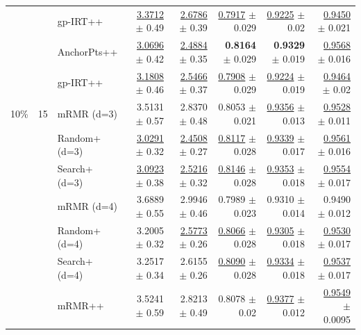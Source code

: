 \begin{longtable}{llp{}rrrrr}
 &  & gp-IRT++ & \underline{3.3712} {\scriptsize $\pm$ 0.49} & \underline{2.6786} {\scriptsize $\pm$ 0.39} & \underline{0.7917} {\scriptsize $\pm$ 0.029} & \underline{0.9225} {\scriptsize $\pm$ 0.02} & \underline{0.9450} {\scriptsize $\pm$ 0.021} \\
 &  & AnchorPts++ & \underline{3.0696} {\scriptsize $\pm$ 0.42} & \underline{2.4884} {\scriptsize $\pm$ 0.35} & \textbf{0.8164} {\scriptsize $\pm$ 0.029} & \textbf{0.9329} {\scriptsize $\pm$ 0.019} & \underline{0.9568} {\scriptsize $\pm$ 0.016} \\
 &  & gp-IRT++ & \underline{3.1808} {\scriptsize $\pm$ 0.46} & \underline{2.5466} {\scriptsize $\pm$ 0.37} & \underline{0.7908} {\scriptsize $\pm$ 0.029} & \underline{0.9224} {\scriptsize $\pm$ 0.019} & \underline{0.9464} {\scriptsize $\pm$ 0.02} \\
\midrule
10\% & 15 & mRMR (d=3) & 3.5131 {\scriptsize $\pm$ 0.57} & 2.8370 {\scriptsize $\pm$ 0.48} & 0.8053 {\scriptsize $\pm$ 0.021} & \underline{0.9356} {\scriptsize $\pm$ 0.013} & \underline{0.9528} {\scriptsize $\pm$ 0.011} \\
 &  & Random+ (d=3) & \underline{3.0291} {\scriptsize $\pm$ 0.32} & \underline{2.4508} {\scriptsize $\pm$ 0.27} & \underline{0.8117} {\scriptsize $\pm$ 0.028} & \underline{0.9339} {\scriptsize $\pm$ 0.017} & \underline{0.9561} {\scriptsize $\pm$ 0.016} \\
 &  & Search+ (d=3) & \underline{3.0923} {\scriptsize $\pm$ 0.38} & \underline{2.5216} {\scriptsize $\pm$ 0.32} & \underline{0.8146} {\scriptsize $\pm$ 0.028} & \underline{0.9353} {\scriptsize $\pm$ 0.018} & \underline{0.9554} {\scriptsize $\pm$ 0.017} \\
 &  & mRMR (d=4) & 3.6889 {\scriptsize $\pm$ 0.55} & 2.9946 {\scriptsize $\pm$ 0.46} & 0.7989 {\scriptsize $\pm$ 0.023} & 0.9310 {\scriptsize $\pm$ 0.014} & 0.9490 {\scriptsize $\pm$ 0.012} \\
 &  & Random+ (d=4) & 3.2005 {\scriptsize $\pm$ 0.32} & \underline{2.5773} {\scriptsize $\pm$ 0.26} & \underline{0.8066} {\scriptsize $\pm$ 0.028} & \underline{0.9305} {\scriptsize $\pm$ 0.018} & \underline{0.9530} {\scriptsize $\pm$ 0.017} \\
 &  & Search+ (d=4) & 3.2517 {\scriptsize $\pm$ 0.34} & 2.6155 {\scriptsize $\pm$ 0.26} & \underline{0.8090} {\scriptsize $\pm$ 0.028} & \underline{0.9334} {\scriptsize $\pm$ 0.018} & \underline{0.9537} {\scriptsize $\pm$ 0.017} \\
 &  & mRMR++ & 3.5241 {\scriptsize $\pm$ 0.59} & 2.8213 {\scriptsize $\pm$ 0.49} & 0.8078 {\scriptsize $\pm$ 0.02} & \underline{0.9377} {\scriptsize $\pm$ 0.012} & \underline{0.9549} {\scriptsize $\pm$ 0.0095} \\

\end{longtable}
